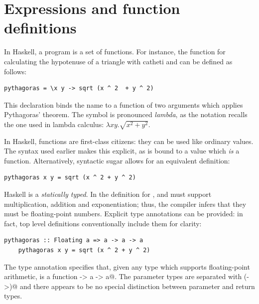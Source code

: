 \documentclass[UdineBachThesis,american,11pt,draft]{PhdThesis}
\begin{document}
  \section{Expressions and function definitions}

  In Haskell, a program is a set of functions. For instance, the function for
  calculating the hypotenuse of a triangle with catheti \lstinline@x@ and
  \lstinline@y@ can be defined as follows:

  \begin{lstlisting}[gobble=4,basicstyle=\ttfamily\small]
    pythagoras = \x y -> sqrt (x ^ 2  + y ^ 2)
  \end{lstlisting}

  This declaration binds the name \lstinline@pythagoras@ to a function of two
  arguments which applies Pythagoras' theorem. The symbol \lstinline@\@ is
  pronounced \emph{lambda}, as the notation recalls the one used in lambda
  calculus: $\lambda x y . \sqrt{x^2 + y^2}$.

  In Haskell, functions are first-class citizens: they can be used like ordinary
  values. The syntax used earlier makes this explicit, as \lstinline@pythagoras@
  is bound to a value which \emph{is} a function. Alternatively, syntactic sugar
  allows for an equivalent definition:

  \begin{lstlisting}[gobble=4,basicstyle=\ttfamily\small]
    pythagoras x y = sqrt (x ^ 2 + y ^ 2)
  \end{lstlisting}

  Haskell is a \emph{statically typed}. In the definition for
  \lstinline@pythagoras@, \lstinline@x@ and \lstinline@y@ must support
  multiplication, addition and exponentiation; thus, the compiler infers that
  they must be floating-point numbers. Explicit type annotations can be
  provided: in fact, top level definitions conventionally include them for
  clarity:

  \begin{lstlisting}[gobble=4,basicstyle=\ttfamily\small]
    pythagoras :: Floating a => a -> a -> a
    pythagoras x y = sqrt (x ^ 2 + y ^ 2)
  \end{lstlisting}

  The type annotation specifies that, given any type \lstinline@a@ which
  supports floating-point arithmetic, \lstinline@pythagoras@ is a function
  \lstinline@a -> a -> a@. The parameter types are separated with
  \lstinline@(->)@ and there appears to be no special distinction between
  parameter and return types.
\end{document}
